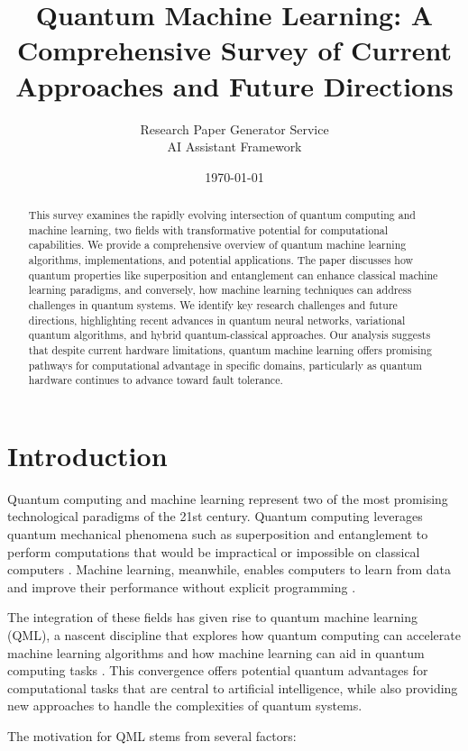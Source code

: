 \documentclass[12pt,a4paper]{article}
\title{Quantum Machine Learning: A Comprehensive Survey of Current Approaches and Future Directions}
\author{Research Paper Generator Service\\
AI Assistant Framework}
\date{\today}
\begin{document}
\maketitle

\begin{abstract}
This survey examines the rapidly evolving intersection of quantum computing and machine learning, two fields with transformative potential for computational capabilities. We provide a comprehensive overview of quantum machine learning algorithms, implementations, and potential applications. The paper discusses how quantum properties like superposition and entanglement can enhance classical machine learning paradigms, and conversely, how machine learning techniques can address challenges in quantum systems. We identify key research challenges and future directions, highlighting recent advances in quantum neural networks, variational quantum algorithms, and hybrid quantum-classical approaches. Our analysis suggests that despite current hardware limitations, quantum machine learning offers promising pathways for computational advantage in specific domains, particularly as quantum hardware continues to advance toward fault tolerance.
\end{abstract}

\section{Introduction}

Quantum computing and machine learning represent two of the most promising technological paradigms of the 21st century. Quantum computing leverages quantum mechanical phenomena such as superposition and entanglement to perform computations that would be impractical or impossible on classical computers \citep{Nielsen2010}. Machine learning, meanwhile, enables computers to learn from data and improve their performance without explicit programming \citep{Murphy2012}.

The integration of these fields has given rise to quantum machine learning (QML), a nascent discipline that explores how quantum computing can accelerate machine learning algorithms and how machine learning can aid in quantum computing tasks \citep{Biamonte2017}. This convergence offers potential quantum advantages for computational tasks that are central to artificial intelligence, while also providing new approaches to handle the complexities of quantum systems.

The motivation for QML stems from several factors:
\end{document}
